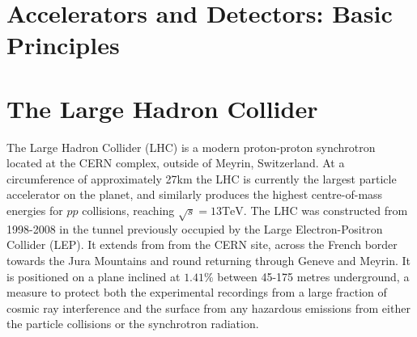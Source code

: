 
\section{Accelerators and Detectors: Basic Principles}


\section{The Large Hadron Collider}
The Large Hadron Collider (LHC) is a modern proton-proton synchrotron located at the CERN complex, outside of Meyrin, Switzerland. At a circumference of approximately 27km the LHC is currently the largest particle accelerator on the planet, and similarly produces the highest centre-of-mass energies for $pp$ collisions, reaching $\sqrt{s}=13\text{TeV}$. The LHC was constructed from 1998-2008 in the tunnel previously occupied by the Large Electron-Positron Collider (LEP). It extends from from the CERN site, across the French border towards the Jura Mountains and round returning through Geneve and Meyrin. It is positioned on a plane inclined at $1.41\%$ between 45-175 metres underground, a measure to protect both the experimental recordings from a large fraction of cosmic ray interference and the surface from any hazardous emissions from either the particle collisions or the synchrotron radiation.

